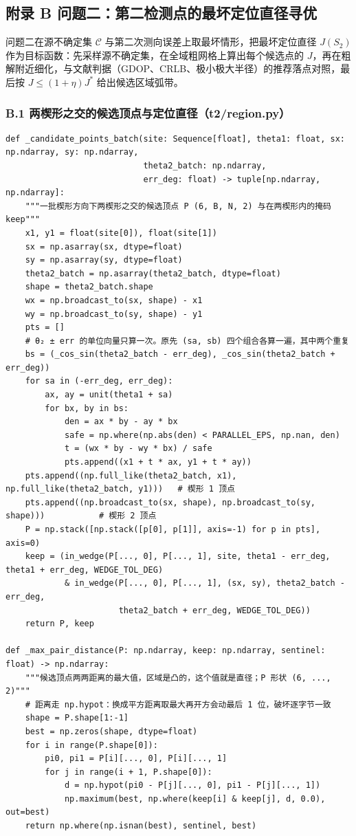 \documentclass[UTF8, zihao=5,AutoFakeBold=2]{ctexart}
\begin{document}
\subsection*{附录 B \quad 问题二：第二检测点的最坏定位直径寻优}

	\noindent 问题二在源不确定集 $\mathcal{C}$ 与第二次测向误差上取最坏情形，把最坏定位直径 $J(S_2)$ 作为目标函数：先采样源不确定集，在全域粗网格上算出每个候选点的 $J$，再在粗解附近细化，与文献判据（GDOP、CRLB、极小极大半径）的推荐落点对照，最后按 $J\le(1+\eta)J^*$ 给出候选区域弧带。

	\subsubsection*{B.1 \quad 两楔形之交的候选顶点与定位直径（t2/region.py）}
	\begin{lstlisting}
def _candidate_points_batch(site: Sequence[float], theta1: float, sx: np.ndarray, sy: np.ndarray,
                            theta2_batch: np.ndarray,
                            err_deg: float) -> tuple[np.ndarray, np.ndarray]:
    """一批楔形方向下两楔形之交的候选顶点 P (6, B, N, 2) 与在两楔形内的掩码 keep"""
    x1, y1 = float(site[0]), float(site[1])
    sx = np.asarray(sx, dtype=float)
    sy = np.asarray(sy, dtype=float)
    theta2_batch = np.asarray(theta2_batch, dtype=float)
    shape = theta2_batch.shape
    wx = np.broadcast_to(sx, shape) - x1
    wy = np.broadcast_to(sy, shape) - y1
    pts = []
    # θ₂ ± err 的单位向量只算一次。原先 (sa, sb) 四个组合各算一遍，其中两个重复
    bs = (_cos_sin(theta2_batch - err_deg), _cos_sin(theta2_batch + err_deg))
    for sa in (-err_deg, err_deg):
        ax, ay = unit(theta1 + sa)
        for bx, by in bs:
            den = ax * by - ay * bx
            safe = np.where(np.abs(den) < PARALLEL_EPS, np.nan, den)
            t = (wx * by - wy * bx) / safe
            pts.append((x1 + t * ax, y1 + t * ay))
    pts.append((np.full_like(theta2_batch, x1), np.full_like(theta2_batch, y1)))   # 楔形 1 顶点
    pts.append((np.broadcast_to(sx, shape), np.broadcast_to(sy, shape)))           # 楔形 2 顶点
    P = np.stack([np.stack([p[0], p[1]], axis=-1) for p in pts], axis=0)
    keep = (in_wedge(P[..., 0], P[..., 1], site, theta1 - err_deg, theta1 + err_deg, WEDGE_TOL_DEG)
            & in_wedge(P[..., 0], P[..., 1], (sx, sy), theta2_batch - err_deg,
                       theta2_batch + err_deg, WEDGE_TOL_DEG))
    return P, keep

def _max_pair_distance(P: np.ndarray, keep: np.ndarray, sentinel: float) -> np.ndarray:
    """候选顶点两两距离的最大值，区域是凸的，这个值就是直径；P 形状 (6, ..., 2)"""
    # 距离走 np.hypot：换成平方距离取最大再开方会动最后 1 位，破坏逐字节一致
    shape = P.shape[1:-1]
    best = np.zeros(shape, dtype=float)
    for i in range(P.shape[0]):
        pi0, pi1 = P[i][..., 0], P[i][..., 1]
        for j in range(i + 1, P.shape[0]):
            d = np.hypot(pi0 - P[j][..., 0], pi1 - P[j][..., 1])
            np.maximum(best, np.where(keep[i] & keep[j], d, 0.0), out=best)
    return np.where(np.isnan(best), sentinel, best)


\end{lstlisting}
\end{document}
